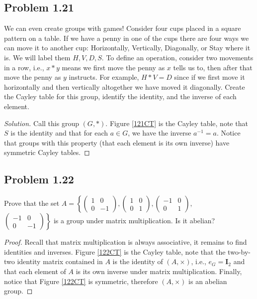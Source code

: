 \documentclass{amsbook}
\begin{document}
			\subsection*{Problem 1.21}
			\label{sub:problem_1_21}
			We can even create groups with games! 
			Consider four cups placed in a square pattern on a table. 
			If we have a penny in one of the cups there are four ways we can move it to another cup: Horizontally, Vertically, Diagonally, or Stay where it is. 
			We will label them $H, V, D, S$. 
			To define an operation, consider two movements in a row, i.e., $x*y$ means we first move the penny as $x$ tells us to, then after that move the penny as $y$ instructs. 
			For example, $H * V = D$ since if we first move it horizontally and then vertically altogether we have moved it diagonally. 
			Create the Cayley table for this group, identify the identity, and the inverse of each element.
			\begin{proof}[Solution] Call this group $(G, *)$.
			Figure \ref{121CT} is the Cayley table, note that $S$ is the identity and that for each $a \in G$, we have the inverse $a^{-1} = a$.
			Notice that groups with this property (that each element is its own inverse) have symmetric Cayley tables.
			\end{proof}

			\subsection*{Problem 1.22}
			\label{sub:problem_1_22}
			Prove that the set $A = \left\{ \begin{pmatrix} 1 & 0 \\ 0 & -1 \end{pmatrix}, \begin{pmatrix} 1 & 0 \\ 0 & 1 \end{pmatrix}, \begin{pmatrix} -1 & 0 \\ 0 & 1 \end{pmatrix}, \right.$ \\
			$ \left. \begin{pmatrix} -1 & 0 \\ 0 & -1 \end{pmatrix} \right\}$ is a group under matrix multiplication. 
			Is it abelian?
			\begin{proof} Recall that matrix multiplication is always associative, it remains to find identities and inverses.
			Figure \ref{122CT} is the Cayley table, note that the two-by-two identity matrix contained in $A$ is the identity of $(A,\times)$, i.e., $e_{G} = \mathbf{I}_{2}$ and that each element of $A$ is its own inverse under matrix multiplication.
			Finally, notice that Figure \ref{122CT} is symmetric, therefore $(A, \times)$ is an abelian group.
			\end{proof}
\end{document}
